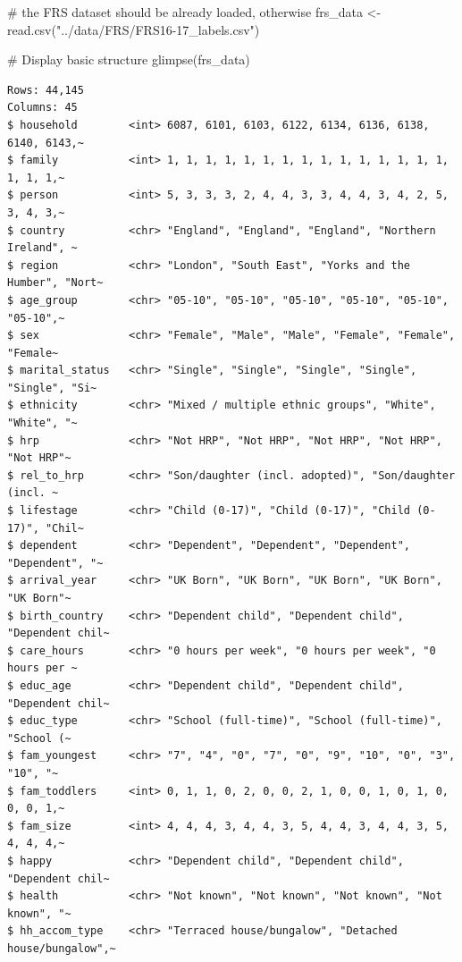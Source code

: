 \documentclass[
  letterpaper,
  DIV=11,
  numbers=noendperiod]{scrreprt}
\newenvironment{Shaded}{\begin{snugshade}}{\end{snugshade}}
\newcommand{\CommentTok}[1]{\textcolor[rgb]{0.37,0.37,0.37}{#1}}
\newcommand{\FunctionTok}[1]{\textcolor[rgb]{0.28,0.35,0.67}{#1}}
\newcommand{\NormalTok}[1]{\textcolor[rgb]{0.00,0.23,0.31}{#1}}
\newcommand{\OtherTok}[1]{\textcolor[rgb]{0.00,0.23,0.31}{#1}}
\newcommand{\StringTok}[1]{\textcolor[rgb]{0.13,0.47,0.30}{#1}}
\begin{document}
\begin{Shaded}
\begin{Highlighting}[]
\CommentTok{\# the FRS dataset should be already loaded, otherwise}
\NormalTok{frs\_data }\OtherTok{\textless{}{-}} \FunctionTok{read.csv}\NormalTok{(}\StringTok{"../data/FRS/FRS16{-}17\_labels.csv"}\NormalTok{) }

\CommentTok{\# Display basic structure }
\FunctionTok{glimpse}\NormalTok{(frs\_data)}
\end{Highlighting}
\end{Shaded}

\begin{verbatim}
Rows: 44,145
Columns: 45
$ household        <int> 6087, 6101, 6103, 6122, 6134, 6136, 6138, 6140, 6143,~
$ family           <int> 1, 1, 1, 1, 1, 1, 1, 1, 1, 1, 1, 1, 1, 1, 1, 1, 1, 1,~
$ person           <int> 5, 3, 3, 3, 2, 4, 4, 3, 3, 4, 4, 3, 4, 2, 5, 3, 4, 3,~
$ country          <chr> "England", "England", "England", "Northern Ireland", ~
$ region           <chr> "London", "South East", "Yorks and the Humber", "Nort~
$ age_group        <chr> "05-10", "05-10", "05-10", "05-10", "05-10", "05-10",~
$ sex              <chr> "Female", "Male", "Male", "Female", "Female", "Female~
$ marital_status   <chr> "Single", "Single", "Single", "Single", "Single", "Si~
$ ethnicity        <chr> "Mixed / multiple ethnic groups", "White", "White", "~
$ hrp              <chr> "Not HRP", "Not HRP", "Not HRP", "Not HRP", "Not HRP"~
$ rel_to_hrp       <chr> "Son/daughter (incl. adopted)", "Son/daughter (incl. ~
$ lifestage        <chr> "Child (0-17)", "Child (0-17)", "Child (0-17)", "Chil~
$ dependent        <chr> "Dependent", "Dependent", "Dependent", "Dependent", "~
$ arrival_year     <chr> "UK Born", "UK Born", "UK Born", "UK Born", "UK Born"~
$ birth_country    <chr> "Dependent child", "Dependent child", "Dependent chil~
$ care_hours       <chr> "0 hours per week", "0 hours per week", "0 hours per ~
$ educ_age         <chr> "Dependent child", "Dependent child", "Dependent chil~
$ educ_type        <chr> "School (full-time)", "School (full-time)", "School (~
$ fam_youngest     <chr> "7", "4", "0", "7", "0", "9", "10", "0", "3", "10", "~
$ fam_toddlers     <int> 0, 1, 1, 0, 2, 0, 0, 2, 1, 0, 0, 1, 0, 1, 0, 0, 0, 1,~
$ fam_size         <int> 4, 4, 4, 3, 4, 4, 3, 5, 4, 4, 3, 4, 4, 3, 5, 4, 4, 4,~
$ happy            <chr> "Dependent child", "Dependent child", "Dependent chil~
$ health           <chr> "Not known", "Not known", "Not known", "Not known", "~
$ hh_accom_type    <chr> "Terraced house/bungalow", "Detached house/bungalow",~

\end{verbatim}
\end{document}
